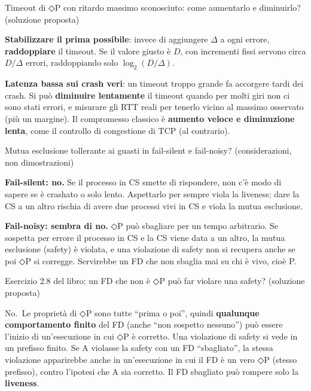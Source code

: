\begin{approfondimento}{Timeout di ◇P con ritardo massimo sconosciuto: come aumentarlo e
diminuirlo? (soluzione proposta)}

\textbf{Stabilizzare il prima possibile}: invece di aggiungere \(\Delta\) a ogni errore, \textbf{raddoppiare} il timeout. Se il valore giusto è \(D\), con incrementi fissi servono circa \(D/\Delta\) errori, raddoppiando solo \(\log_2(D/\Delta)\).

\textbf{Latenza bassa sui crash veri}: un timeout troppo grande fa accorgere tardi dei crash. Si può \textbf{diminuire lentamente} il timeout quando per molti giri non ci sono stati errori, e misurare gli RTT reali per tenerlo vicino al massimo osservato (più un margine). Il compromesso classico è \textbf{aumento veloce e diminuzione lenta}, come il controllo di congestione di TCP (al contrario).

\end{approfondimento}

\begin{approfondimento}{Mutua esclusione tollerante ai guasti in fail-silent e fail-noisy?
(considerazioni, non dimostrazioni)}

\textbf{Fail-silent: no.} Se il processo in CS smette di rispondere, non c'è modo di sapere se è crashato o solo lento. Aspettarlo per sempre viola la liveness; dare la CS a un altro rischia di avere due processi vivi in CS e viola la mutua esclusione.

\textbf{Fail-noisy: sembra di no.} ◇P può sbagliare per un tempo arbitrario. Se sospetta per errore il processo in CS e la CS viene data a un altro, la mutua esclusione (safety) è violata, e una violazione di safety non si recupera anche se poi ◇P si corregge. Servirebbe un FD che non sbaglia mai su chi è vivo, cioè P.

\end{approfondimento}

\begin{approfondimento}{Esercizio 2.8 del libro: un FD che non è ◇P può far violare una safety?
(soluzione proposta)}

No.~Le proprietà di ◇P sono tutte ``prima o poi'', quindi \textbf{qualunque comportamento finito} del FD (anche ``non sospetto nessuno'') può essere l'inizio di un'esecuzione in cui ◇P è corretto. Una violazione di safety si vede in un prefisso finito. Se A violasse la safety con un FD ``sbagliato'', la stessa violazione apparirebbe anche in un'esecuzione in cui il FD è un vero ◇P (stesso prefisso), contro l'ipotesi che A sia corretto. Il FD sbagliato può rompere solo la \textbf{liveness}.

\end{approfondimento}

